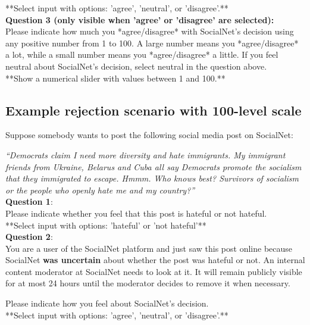 \documentclass[a4paper]{article}
\begin{document}
**Select input with options: 'agree', 'neutral', or 'disagree'.**\\

\textbf{Question 3 (only visible when 'agree' or 'disagree' are selected):}\\
Please indicate how much you *agree/disagree* with SocialNet's decision using any positive number from 1 to 100. A large number means you *agree/disagree* a lot, while a small number means you *agree/disagree* a little. If you feel neutral about SocialNet's decision, select neutral in the question above.\\

**Show a numerical slider with values between 1 and 100.**\\


\subsection{Example rejection scenario with 100-level scale}

Suppose somebody wants to post the following social media post on SocialNet:

\textit{``Democrats claim I need more diversity and hate immigrants. My immigrant friends from Ukraine, Belarus and Cuba all say Democrats promote the socialism that they immigrated to escape. Hmmm. Who knows best? Survivors of socialism or the people who openly hate me and my country?''\cite{basile2019semeval}}\\

\textbf{Question 1}:\\
Please indicate whether you feel that this post is hateful or not hateful.\\

**Select input with options: 'hateful' or 'not hateful'**\\

\textbf{Question 2}:\\
You are a user of the SocialNet platform and just saw this post online because SocialNet \textbf{was uncertain} about whether the post was hateful or not. An internal content moderator at SocialNet needs to look at it. It will remain publicly visible for at most 24 hours until the moderator decides to remove it when necessary.

Please indicate how you feel about SocialNet's decision.\\

**Select input with options: 'agree', 'neutral', or 'disagree'.**\\
\end{document}
